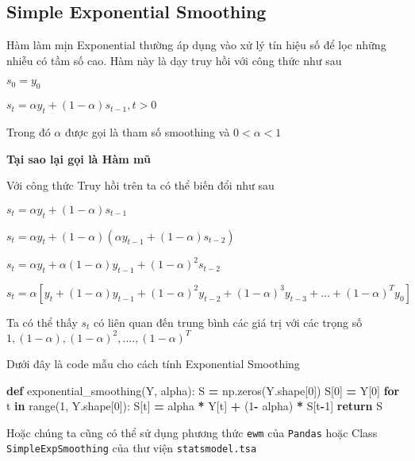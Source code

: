 \documentclass[
]{book}
\newenvironment{Shaded}{\begin{snugshade}}{\end{snugshade}}
\newcommand{\BuiltInTok}[1]{#1}
\newcommand{\ControlFlowTok}[1]{\textcolor[rgb]{0.13,0.29,0.53}{\textbf{#1}}}
\newcommand{\DecValTok}[1]{\textcolor[rgb]{0.00,0.00,0.81}{#1}}
\newcommand{\KeywordTok}[1]{\textcolor[rgb]{0.13,0.29,0.53}{\textbf{#1}}}
\newcommand{\NormalTok}[1]{#1}
\newcommand{\OperatorTok}[1]{\textcolor[rgb]{0.81,0.36,0.00}{\textbf{#1}}}
\begin{document}
\subsection{Simple Exponential Smoothing}\label{simple-exponential-smoothing}

Hàm làm mịn Exponential thường áp dụng vào xử lý tín hiệu số để lọc những nhiễu có tầm số cao. Hàm này là dạy truy hồi với công thức như sau

\(s_{0} = y_{0}\)

\(s_{t} = \alpha y_{t} + (1 - \alpha)s_{t-1}, t > 0\)

Trong đó \(\alpha\) được gọi là tham số smoothing và \(0 < \alpha < 1\)

\textbf{Tại sao lại gọi là Hàm mũ}

Với công thức Truy hồi trên ta có thể biến đổi như sau

\(s_t = \alpha y_t + (1 - \alpha)s_{t-1}\)

\(s_t = \alpha y_t + (1 - \alpha)(\alpha y_{t-1} + (1 - \alpha)s_{t-2})\)

\(s_t = \alpha y_t + \alpha(1 - \alpha)y_{t-1} + (1-\alpha)^2s_{t-2}\)

\(s_t = \alpha[y_t + (1 - \alpha)y_{t-1} + (1-\alpha)^2y_{t-2} + (1-\alpha)^3y_{t-3} + ... +(1-\alpha)^Ty_0]\)

Ta có thể thấy \(s_t\) có liên quan đến trung bình các giá trị với các trọng số
\(1, (1-\alpha), (1-\alpha)^2, ....,(1-\alpha)^T\)

Dưới đây là code mẫu cho cách tính Exponential Smoothing

\begin{Shaded}
\begin{Highlighting}[]
\KeywordTok{def}\NormalTok{ exponential\_smoothing(Y, alpha):}
\NormalTok{    S }\OperatorTok{=}\NormalTok{ np.zeros(Y.shape[}\DecValTok{0}\NormalTok{])}
\NormalTok{    S[}\DecValTok{0}\NormalTok{] }\OperatorTok{=}\NormalTok{ Y[}\DecValTok{0}\NormalTok{]}
    \ControlFlowTok{for}\NormalTok{ t }\KeywordTok{in} \BuiltInTok{range}\NormalTok{(}\DecValTok{1}\NormalTok{, Y.shape[}\DecValTok{0}\NormalTok{]):}
\NormalTok{        S[t] }\OperatorTok{=}\NormalTok{ alpha }\OperatorTok{*}\NormalTok{ Y[t] }\OperatorTok{+}\NormalTok{ (}\DecValTok{1}\OperatorTok{{-}}\NormalTok{ alpha) }\OperatorTok{*}\NormalTok{ S[t}\OperatorTok{{-}}\DecValTok{1}\NormalTok{]}
    \ControlFlowTok{return}\NormalTok{ S}
\end{Highlighting}
\end{Shaded}

Hoặc chúng ta cũng có thể sử dụng phương thức \texttt{ewm} của \texttt{Pandas} hoặc Class \texttt{SimpleExpSmoothing} của thư viện \texttt{statsmodel.tsa}
\end{document}
